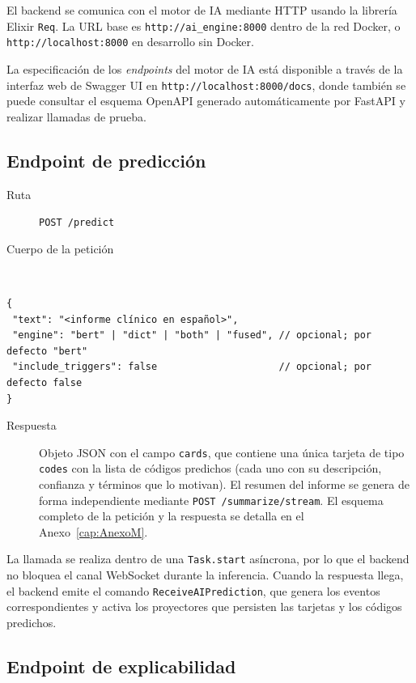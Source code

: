 El backend se comunica con el motor de IA mediante HTTP usando la librería Elixir \texttt{Req}. La URL base es \texttt{http://ai\_engine:8000} dentro de la red Docker, o \texttt{http://localhost:8000} en desarrollo sin Docker.

La especificación de los \emph{endpoints} del motor de IA está disponible a través de la interfaz web de Swagger UI en \texttt{http://localhost:8000/docs}, donde también se puede consultar el esquema OpenAPI generado automáticamente por FastAPI y realizar llamadas de prueba.

\subsection{Endpoint de predicción}

\begin{description}
 \item[Ruta] \texttt{POST /predict}
 \item[Cuerpo de la petición]~
\end{description}

\begin{verbatim}
{
 "text": "<informe clínico en español>",
 "engine": "bert" | "dict" | "both" | "fused", // opcional; por defecto "bert"
 "include_triggers": false                     // opcional; por defecto false
}
\end{verbatim}

\begin{description}
 \item[Respuesta] Objeto JSON con el campo \texttt{cards}, que contiene una única tarjeta de tipo \texttt{codes} con la lista de códigos predichos (cada uno con su descripción, confianza y términos que lo motivan). El resumen del informe se genera de forma independiente mediante \texttt{POST /summarize/stream}. El esquema completo de la petición y la respuesta se detalla en el Anexo~\ref{cap:AnexoM}.
\end{description}

La llamada se realiza dentro de una \texttt{Task.start} asíncrona, por lo que el backend no bloquea el canal WebSocket durante la inferencia. Cuando la respuesta llega, el backend emite el comando \texttt{ReceiveAIPrediction}, que genera los eventos correspondientes y activa los proyectores que persisten las tarjetas y los códigos predichos.

\subsection{Endpoint de explicabilidad}

